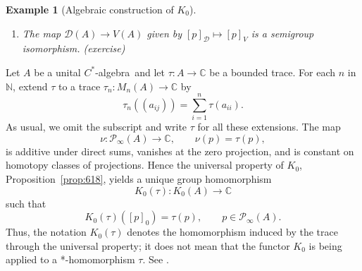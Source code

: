 \documentclass{book}
\newtheorem{example}[definition]{Example}
\def\cstar{\(C^*\)-algebra}
\begin{document}
\begin{example}[Algebraic construction of \(K_0\)]
\begin{enumerate}
    zeros, if necessary) \(p,q\in M_n(A)\) and \(a,b\in M_n(A)\) are such that \(p=ab\), \(q=ba\), \(a=aba\) (hence \(a=paq\)), \(b=bab\) (hence \(b=qbp\)).
    Then \(b^* b=(bab)^* b=(ab)^*b^*b=pb^*b\).
    It follows that \(b^*b\) belongs to the corner \cstar\ \(pM_n(A)p\).
    Since \(p=(ab)^*ab=b^*(a^*a)b\leq\|a\|^2 b^*b\), the element \(b^* b\) is invertible in \(pM_n(A)p\).
    Set \(v=bp(b^*b)^{-1/2}\). We have \(p=v^* v\) (straightforward calculation). In particular, \(v\) is a partial isometry. In fact, \(b=v|b|\)
    is the polar decomposition of \(b\) in \(M_n(A)\). Hence \(bb^*=vb^*bv^*\).\par
    It now suffices to show that \(q=vv^*\). First note that \(v=qv\) (directly follows from the definition of \(v\)). Thus
    \[
      vv^*=qvv^*q\leq\|v\|^2 q=q=baa^*b^*\leq\|a\|^2bb^*=\|a\|^2vb^*bv^*\leq\|a\|^2\|b\|^2vv^*.
    \]
    That is, \(vv^*\) and \(q\) are projections satisfying \(vv^*\leq q\leq \|a\|^2\|b\|^2vv^*\). It follows that
    \(vv^*=q\).
    \item The map \(\mathcal{D}(A)\to V(A)\) given by \({[p]}_\mathcal{D}\mapsto{[p]}_V\) is a semigroup isomorphism. (exercise)
  \end{enumerate}
\end{example}

Let \(A\) be a unital \cstar\ and let \(\tau:A\to\mathbb{C}\) be a bounded trace. For each
\(n\) in \(\mathbb{N}\), extend \(\tau\) to a trace \(\tau_n:M_n(A)\to\mathbb{C}\) by
\[
  \tau_n((a_{ij}))=\sum_{i=1}^n\tau(a_{ii}).
\]
As usual, we omit the subscript and write \(\tau\) for all these extensions. The map
\[
  \nu:\mathcal{P}_\infty(A)\to\mathbb{C},\qquad \nu(p)=\tau(p),
\]
is additive under direct sums, vanishes at the zero projection, and is constant on homotopy
classes of projections. Hence the universal property of \(K_0\), Proposition~\ref{prop:618},
yields a unique group homomorphism
\[
  K_0(\tau):K_0(A)\to\mathbb{C}
\]
such that
\[
  K_0(\tau)([p]_0)=\tau(p),\qquad p\in\mathcal{P}_\infty(A).
\]
Thus, the notation \(K_0(\tau)\) denotes the homomorphism induced by the trace through the
universal property; it does not mean that the functor \(K_0\) is being applied to a
*-homomorphism \(\tau\). See \cite[Section~3.3.1]{RordamLarsenLaustsen2000}.
\end{document}
